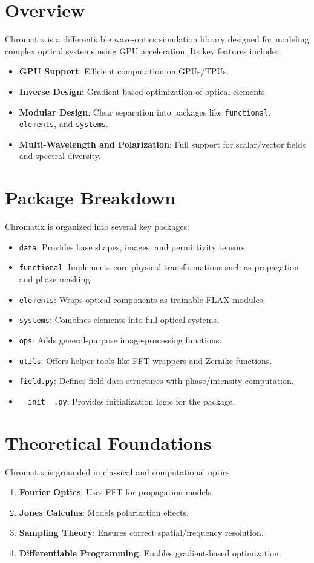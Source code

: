 \documentclass[a4paper,12pt]{report}
\begin{document}
\section{Overview}
Chromatix is a differentiable wave-optics simulation library designed for modeling complex optical systems using GPU acceleration. Its key features include:
\begin{itemize}
    \item \textbf{GPU Support}: Efficient computation on GPUs/TPUs.
    \item \textbf{Inverse Design}: Gradient-based optimization of optical elements.
    \item \textbf{Modular Design}: Clear separation into packages like \texttt{functional}, \texttt{elements}, and \texttt{systems}.
    \item \textbf{Multi-Wavelength and Polarization}: Full support for scalar/vector fields and spectral diversity.
\end{itemize}

\section{Package Breakdown}
Chromatix is organized into several key packages:
\begin{itemize}
    \item \texttt{data}: Provides base shapes, images, and permittivity tensors.
    \item \texttt{functional}: Implements core physical transformations such as propagation and phase masking.
    \item \texttt{elements}: Wraps optical components as trainable FLAX modules.
    \item \texttt{systems}: Combines elements into full optical systems.
    \item \texttt{ops}: Adds general-purpose image-processing functions.
    \item \texttt{utils}: Offers helper tools like FFT wrappers and Zernike functions.
    \item \texttt{field.py}: Defines field data structures with phase/intensity computation.
    \item \texttt{\_\_init\_\_.py}: Provides initialization logic for the package.
\end{itemize}

\section{Theoretical Foundations}
Chromatix is grounded in classical and computational optics:
\begin{enumerate}
    \item \textbf{Fourier Optics}: Uses FFT for propagation models.
    \item \textbf{Jones Calculus}: Models polarization effects.
    \item \textbf{Sampling Theory}: Ensures correct spatial/frequency resolution.
    \item \textbf{Differentiable Programming}: Enables gradient-based optimization.
\end{enumerate}
\end{document}
